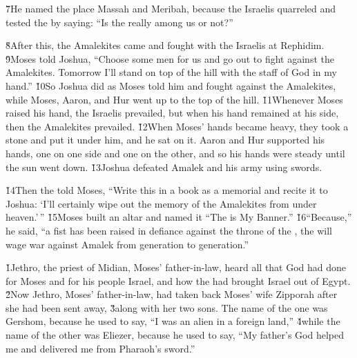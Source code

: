 \v{7}He named the place Massah and Meribah, because the Israelis quarreled and tested the  by saying: ``Is the  really among us or not?''

\v{8}After this, the Amalekites came and fought with the Israelis at Rephidim. \v{9}Moses told Joshua, ``Choose some men for us and go out to fight against the Amalekites. Tomorrow I'll stand on top of the hill with the staff of God in my hand.'' \v{10}So Joshua did as Moses told him and fought against the Amalekites, while Moses, Aaron, and Hur went up to the top of the hill. \v{11}Whenever Moses raised his hand, the Israelis prevailed, but when his hand remained at his side, then the Amalekites prevailed. \v{12}When Moses' hands became heavy, they took a stone and put it under him, and he sat on it. Aaron and Hur supported his hands, one on one side and one on the other, and so his hands were steady until the sun went down. \v{13}Joshua defeated Amalek and his army using swords.

\v{14}Then the  told Moses, ``Write this in a book as a memorial and recite it to Joshua: `I'll certainly wipe out the memory of the Amalekites from under heaven.'\,'' \v{15}Moses built an altar and named it ``The  is My Banner.'' \v{16}``Because,'' he said, ``a fist has been raised in defiance against the throne of the , the  will wage war against Amalek from generation to generation.''

\v{1}Jethro, the priest of Midian, Moses' father-in-law, heard all that God had done for Moses and for his people Israel, and how the  had brought Israel out of Egypt. \v{2}Now Jethro, Moses' father-in-law, had taken back Moses' wife Zipporah after she had been sent away, \v{3}along with her two sons. The name of the one was Gershom, because he used to say, ``I was an alien in a foreign land,'' \v{4}while the name of the other was Eliezer, because he used to say, ``My father's God helped me and delivered me from Pharaoh's sword.''

